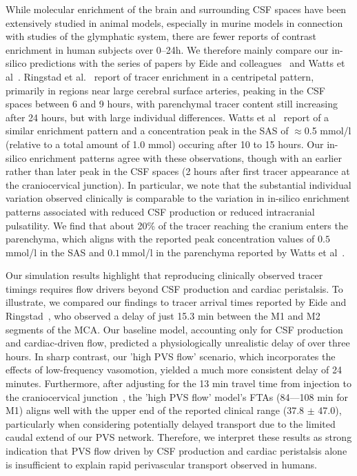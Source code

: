 \documentclass[fleqn,10pt]{wlscirep}
\begin{document}
While molecular enrichment of the brain and surrounding CSF spaces
have been extensively studied in animal models, especially in murine
models in connection with studies of the glymphatic system, there are
fewer reports of contrast enrichment in human subjects over 0--24h. We
therefore mainly compare our in-silico predictions with the series of
papers by Eide and colleagues~\cite{ringstad2017glymphatic,
  ringstad2018brain, eide2021sleep, eide2024functional} and Watts et
al~\cite{watts2019measuring}. Ringstad et al.~\cite{ringstad2018brain}
report of tracer enrichment in a centripetal pattern, primarily in
regions near large cerebral surface arteries, peaking in the CSF
spaces between 6 and 9 hours, with parenchymal tracer content still
increasing after 24 hours, but with large individual
differences. Watts et al~\cite{watts2019measuring} report of a similar
enrichment pattern and a concentration peak in the SAS of $\approx$0.5
mmol/l (relative to a total amount of 1.0 mmol) occuring after 10 to 15 hours. Our in-silico enrichment
patterns agree with these observations, though with an earlier rather than later peak in the CSF spaces (2 hours after first tracer appearance at the craniocervical junction). In particular, we note that the substantial individual variation observed clinically is comparable to the variation in in-silico enrichment patterns associated with reduced CSF production or reduced intracranial pulsatility. We find that about 20\% of the tracer reaching the cranium enters the parenchyma, which aligns with the reported peak concentration values of $0.5\,$mmol/l in the SAS and $0.1\,$mmol/l in the parenchyma reported by Watts et al~\cite{watts2019measuring}.

Our simulation results highlight that reproducing clinically observed tracer timings requires flow drivers beyond CSF production and cardiac peristalsis. To illustrate, we compared our findings to tracer arrival times reported by Eide and Ringstad~\cite{eide2024functional}, who observed a delay of just 15.3 min between the M1 and M2 segments of the MCA. Our baseline model, accounting only for CSF production and cardiac-driven flow, predicted a physiologically unrealistic delay of over three hours. In sharp contrast, our 'high PVS flow' scenario, which incorporates the effects of low-frequency vasomotion, yielded a much more consistent delay of 24 minutes. Furthermore, after adjusting for the 13 min travel time from injection to the craniocervical junction~\cite{eide2024functional}, the 'high PVS flow' model's FTAs (84––108 min for M1) aligns well with the upper end of the reported clinical range (37.8 $\pm$ 47.0), particularly when considering potentially delayed transport due to the limited caudal extend of our PVS network.
Therefore, we interpret these results as strong indication that PVS flow driven by CSF production and cardiac peristalsis alone is insufficient to explain rapid perivascular transport observed in humans.
\end{document}
